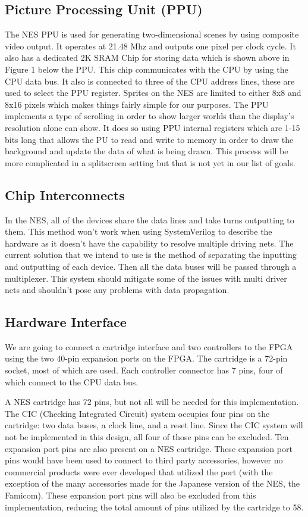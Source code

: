 \documentclass[a4paper]{article}
\begin{document}
\subsection{Picture Processing Unit (PPU)}
The NES PPU is used for generating two-dimensional scenes by using composite video output. It operates at 21.48 Mhz and outputs one pixel per clock cycle. It also has a dedicated 2K SRAM Chip for storing data which is shown above in Figure 1 below the PPU. This chip communicates with the CPU by using the CPU data bus. It also is connected to three of the CPU address lines, these are used to select the PPU register.\cite{nesdev} Sprites on the NES are limited to either 8x8 and 8x16 pixels which makes things fairly simple for our purposes. The PPU implements a type of scrolling in order to show larger worlds than the display's resolution alone can show. It does so using PPU internal registers which are 1-15 bits long that allows the PU to read and write to memory in order to draw the background and update the data of what is being drawn.\cite{nesdev} This process will be more complicated in a splitscreen setting but that is not yet in our list of goals. 

\subsection{Chip Interconnects}
In the NES, all of the devices share the data lines and take turns outputting to them. This method won't work when using SystemVerilog to describe the hardware as it doesn't have the capability to resolve multiple driving nets. The current solution that we intend to use is the method of separating the inputting and outputting of each device. Then all the data buses will be passed through a multiplexer. This system should mitigate some of the issues with multi driver nets and shouldn't pose any problems with data propagation.

\subsection{Hardware Interface}
We are going to connect a cartridge interface and two controllers to the FPGA using the two 40-pin expansion ports on the FPGA. The cartridge is a 72-pin socket, most of which are used. Each controller connector has 7 pins, four of which connect to the CPU data bus.\cite{nesdev}

A NES cartridge has 72 pins, but not all will be needed for this implementation. The CIC (Checking Integrated Circuit) system occupies four pins on the cartridge: two data buses, a clock line, and a reset line. Since the CIC system will not be implemented in this design, all four of those pins can be excluded. Ten expansion port pins are also present on a NES cartridge. These expansion port pins would have been used to connect to third party accessories, however no commercial products were ever developed that utilized the port (with the exception of the many accessories made for the Japanese version of the NES, the Famicom)\cite{EXport}. These expansion port pins will also be excluded from this implementation, reducing the total amount of pins utilized by the cartridge to 58.
\end{document}
